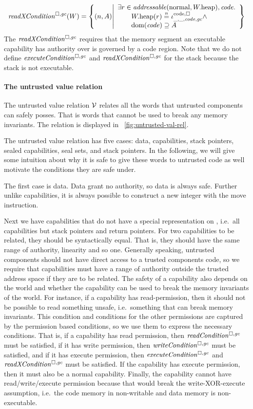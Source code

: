 \begin{jversion}
\[
  \xReadCond{W} = \left\{ \npair{A} \middle| 
    \begin{array}{l}
      \exists r \in \addressable{\normal, \pwheap}, \code \ldotp \\
      \qquad \pwheap(r) \nequal \codereg{\_,\_,\code,\gc}\wedge\\
      \qquad \dom(\code) \supseteq A 
    \end{array}
  \right\}
\]
The $\xReadCond{}$ requires that the memory segment an executable capability has authority over is governed by a code region.
Note that we do not define $\execCond{}$ and $\xReadCond{}$ for the stack because the stack is not executable.

\paragraph{The untrusted value relation}
\label{par:untrusted-val-rel}
The untrusted value relation $\mathcal{V}$ relates all the words that untrusted components can safely posses.
That is words that cannot be used to break any memory invariants.
The relation is displayed in \figurename~\ref{fig:untrusted-val-rel}.

The untrusted value relation has five cases: data, capabilities, stack pointers, sealed capabilities, seal sets, and stack pointers.
In the following, we will give some intuition about why it is safe to give these words to untrusted code as well motivate the conditions they are safe under.

The first case is data.
Data grant no authority, so data is always safe.
Further unlike capabilities, it is always possible to construct a new integer with the move instruction.

Next we have capabilities that do not have a special representation on \srccm{}, i.e.\ all capabilities but stack pointers and return pointers.
For two capabilities to be related, they should be syntactically equal.
That is, they should have the same range of authority, linearity and so one.
Generally speaking, untrusted components should not have direct access to a trusted components code, so we require that capabilities must have a range of authority outside the trusted address space if they are to be related.
The safety of a capability also depends on the world and whether the capability can be used to break the memory invariants of the world.
For instance, if a capability has read-permission, then it should not be possible to read something unsafe, i.e.\ something that can break memory invariants.
This condition and conditions for the other permissions are captured by the permission based conditions, so we use them to express the necessary conditions.
That is, if a capability has read permission, then $\readCond{}$ must be satisfied, if it has write permission, then $\writeCond{}$ must be satisfied, and if it has execute permission, then $\execCond{}$ and $\xReadCond{}$ must be satisfied.
If the capability has execute permission, then it must also be a normal capability.
Finally, the capability cannot have read/write/execute permission because that would break the write-XOR-execute assumption, i.e.\ the code memory in non-writable and data memory is non-executable.


\end{jversion}
